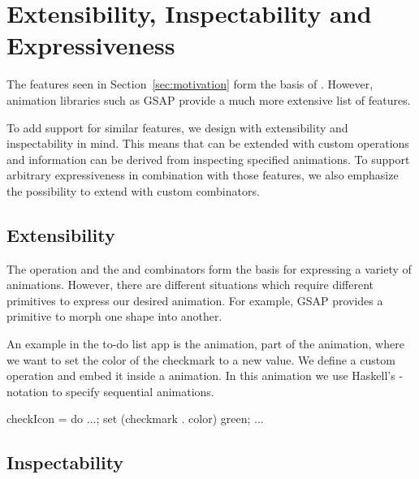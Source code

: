 \section{Extensibility, Inspectability and Expressiveness}
\label{sec:features}

The features seen in Section~\ref{sec:motivation} form the basis of \dsl{}.
However, animation libraries such as GSAP provide a much more extensive list of
features.

To add support for similar features, we design \dsl{} with extensibility and
inspectability in mind. This means that \dsl{} can be extended with custom
operations and information can be derived from inspecting specified animations.
To support arbitrary expressiveness in combination with those
features, we also emphasize the possibility to extend \dsl{} with custom
combinators.

\subsection{Extensibility}
\label{sec:customop}

The  operation and the  and  combinators form the basis for expressing a variety of animations. However, there are different situations which require different primitives to express our desired animation. For example, GSAP provides a primitive to morph one shape into another.

An example in the to-do list app is the  animation, part of the  animation, where we want to set the color of the checkmark to a new value. We define a custom  operation and embed it inside a \dsl{} animation. In this animation we use Haskell's -notation to specify sequential animations.

\begin{spec}
checkIcon = do ...; set (checkmark . color) green; ...
\end{spec}


\subsection{Inspectability}

